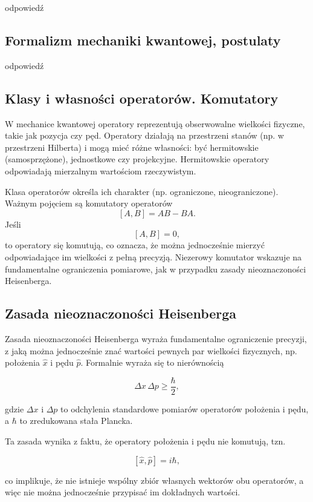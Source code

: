\begin{itemize}
\begin{itemize}
{odpowiedź

\subsection{Formalizm mechaniki kwantowej, postulaty}

odpowiedź

\subsection{Klasy i własności operatorów. Komutatory}

W mechanice kwantowej operatory reprezentują obserwowalne wielkości fizyczne, takie jak pozycja czy pęd. Operatory działają na przestrzeni stanów (np. w przestrzeni Hilberta) i mogą mieć różne własności: być hermitowskie (samosprzężone), jednostkowe czy projekcyjne. Hermitowskie operatory odpowiadają mierzalnym wartościom rzeczywistym.

Klasa operatorów określa ich charakter (np. ograniczone, nieograniczone). Ważnym pojęciem są komutatory operatorów
\[
[A, B] = AB - BA.
\]
Jeśli
\[
[A, B] = 0,
\]
to operatory się komutują, co oznacza, że można jednocześnie mierzyć odpowiadające im wielkości z pełną precyzją. Niezerowy komutator wskazuje na fundamentalne ograniczenia pomiarowe, jak w przypadku zasady nieoznaczoności Heisenberga.

\subsection{Zasada nieoznaczoności Heisenberga}

Zasada nieoznaczoności Heisenberga wyraża fundamentalne ograniczenie precyzji, z jaką można jednocześnie znać wartości pewnych par wielkości fizycznych, np. położenia \( \hat{x} \) i pędu \( \hat{p} \). Formalnie wyraża się to nierównością

\[
\Delta x \, \Delta p \geq \frac{\hbar}{2},
\]

gdzie \( \Delta x \) i \( \Delta p \) to odchylenia standardowe pomiarów operatorów położenia i pędu, a \( \hbar \) to zredukowana stała Plancka.

Ta zasada wynika z faktu, że operatory położenia i pędu nie komutują, tzn.

\[
[\hat{x}, \hat{p}] = i \hbar,
\]

co implikuje, że nie istnieje wspólny zbiór własnych wektorów obu operatorów, a więc nie można jednocześnie przypisać im dokładnych wartości.

}
\end{itemize}
\end{itemize}
